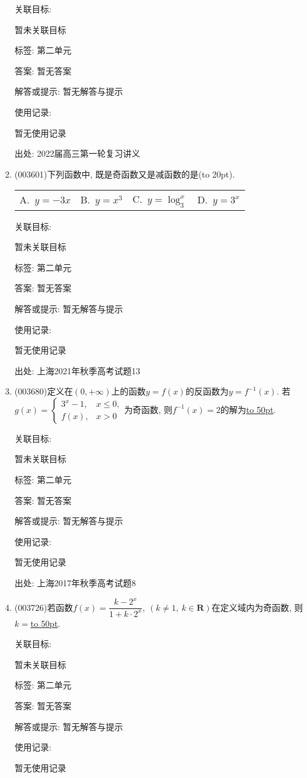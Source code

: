 \documentclass[10pt,a4paper]{article}
\newcommand{\blank}[1]{\underline{\hbox to #1pt{}}}
\newcommand{\bracket}[1]{(\hbox to #1pt{})}
\newcommand{\fourch}[4]{\par\begin{tabular}{p{.23\textwidth}p{.23\textwidth}p{.23\textwidth}p{.23\textwidth}}
A.~#1 &B.~#2& C.~#3& D.~#4
\end{tabular}}
\begin{document}
\begin{enumerate}[1.]
关联目标:

暂未关联目标



标签: 第二单元

答案: 暂无答案

解答或提示: 暂无解答与提示

使用记录:

暂无使用记录


出处: 2022届高三第一轮复习讲义
\item { (003601)}下列函数中, 既是奇函数又是减函数的是\bracket{20}.
\fourch{$y=-3x$}{$y=x^3$}{$y=\log_3^x$}{$y=3^x$}


关联目标:

暂未关联目标



标签: 第二单元

答案: 暂无答案

解答或提示: 暂无解答与提示

使用记录:

暂无使用记录


出处: 上海2021年秋季高考试题13
\item { (003680)}定义在$(0,+\infty)$上的函数$y=f(x)$的反函数为$y=f^{-1}(x)$. 若$g(x)=\begin{cases}3^x-1, & x\le 0,\\ f(x), & x>0\end{cases}$为奇函数, 则$f^{-1}(x)=2$的解为\blank{50}.


关联目标:

暂未关联目标



标签: 第二单元

答案: 暂无答案

解答或提示: 暂无解答与提示

使用记录:

暂无使用记录


出处: 上海2017年秋季高考试题8
\item { (003726)}若函数$f(x)=\dfrac{k-2^x}{1+k\cdot 2^x}, \ (k\ne 1, \ k\in \mathbf{R})$在定义域内为奇函数, 则$k=$\blank{50}.


关联目标:

暂未关联目标



标签: 第二单元

答案: 暂无答案

解答或提示: 暂无解答与提示

使用记录:

暂无使用记录



\end{enumerate}
\end{document}
